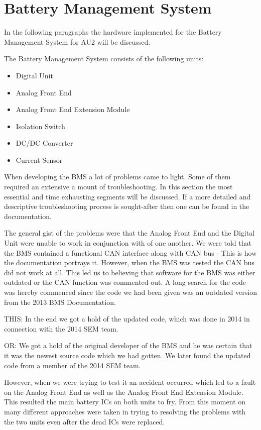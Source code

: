 \section{Battery Management System}
In the following paragraphs the hardware implemented for the Battery Management System for AU2 will be discussed. 

The Battery Management System consists of the following units:
\begin{itemize}
	\item{Digital Unit}
	\item{Analog Front End}
	\item{Analog Front End Extension Module}
	\item{Isolation Switch}
	\item{DC/DC Converter}
	\item{Current Sensor}
\end{itemize}

When developing the BMS a lot of problems came to light. Some of them required an extensive a mount of troubleshooting. In this section the most essential and time exhausting segments will be discussed. If a more detailed and descriptive troubleshooting process is sought-after then one can be found in the documentation.

The general gist of the problems were that the Analog Front End and the Digital Unit were unable to work in conjunction with of one another. We  were told that the BMS contained a functional CAN interface along with CAN bus - This is how the documentation portrays it. However, when the BMS was tested the CAN bus did not work at all. This led us to believing that software for the BMS was either outdated or the CAN function was commented out. A long search for the code was hereby commenced since the code we had been given was an outdated version from the 2013 BMS Documentation\cite{BMSDocumentation}. 

THIS: In the end we got a hold of the updated code, which was done in 2014 in connection with the 2014 SEM team.

OR: We got a hold of the original developer of the BMS and he was certain that it was the newest source code which we had gotten. We later found the updated code from a member of the 2014 SEM team. 

However, when we were trying to test it an accident occurred which led to a fault on the Analog Front End as well as the Analog Front End Extension Module. This resulted the main battery ICs on both units to fry.
From this moment on many different approaches were taken in trying to resolving the problems with the two units even after the dead ICs were replaced. 
